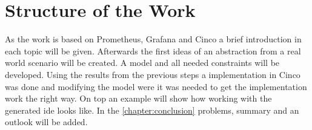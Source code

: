 \section{Structure of the Work}
As the work is based on Prometheus, Grafana and Cinco a brief introduction in each topic will be given. Afterwards the first ideas of an abstraction from a real world scenario will be created. A model and all needed constraints will be developed. Using the results from the previous steps a implementation in Cinco was done and modifying the model were it was needed to get the implementation work the right way. On top an example will show how working with the generated \gls{ide} looks like. In the \autoref{chapter:conclusion} problems, summary and an outlook will be added.